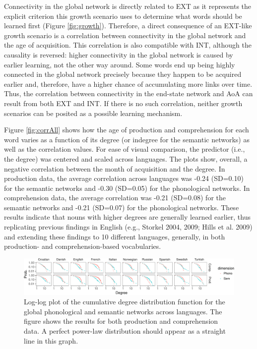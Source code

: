 \documentclass[english,floatsintext,man]{apa6}
\theoremstyle{definition}
\theoremstyle{definition}
\theoremstyle{definition}
\theoremstyle{remark}
\begin{document}
Connectivity in the global network is directly related to EXT as it
represents the explicit criterion this growth scenario uses to determine
what words should be learned first (Figure \ref{fig:growth}). Therefore,
a direct consequence of an EXT-like growth scenario is a correlation
between connectivity in the global network and the age of acquisition.
This correlation is also compatible with INT, although the causality is
reversed: higher connectivity in the global network is caused by earlier
learning, not the other way around. Some words end up being highly
connected in the global network precisely because they happen to be
acquired earlier and, therefore, have a higher chance of accumulating
more links over time. Thus, the correlation between connectivity in the
end-state network and AoA can result from both EXT and INT. If there is
no such correlation, neither growth scenarios can be posited as a
possible learning mechanism.

Figure \ref{fig:corrAll} shows how the age of production and
comprehension for each word varies as a function of its degree (or
indegree for the semantic networks) as well as the correlation values.
For ease of visual comparison, the predictor (i.e., the degree) was
centered and scaled across languages. The plots show, overall, a
negative correlation between the month of acquisition and the degree. In
production data, the average correlation across languages was -0.24
(SD=0.10) for the semantic networks and -0.30 (SD=0.05) for the
phonological networks. In comprehension data, the average correlation
was -0.21 (SD=0.08) for the semantic networks and -0.21 (SD=0.07) for
the phonological networks. These results indicate that nouns with higher
degrees are generally learned earlier, thus replicating previous
findings in English (e.g., Storkel 2004, 2009; Hills et al. 2009) and
extending these findings to 10 different languages, generally, in both
production- and comprehension-based vocabularies.

\begin{figure}[!h]
\includegraphics[width=\textwidth]{ms_files/figure-latex/degreeDist-1} \caption{Log-log plot of the cumulative degree distribution function for the global phonological and semantic networks across languages. The figure shows the results for both production and comprehension data. A perfect power-law distribution should appear as a straight line in this graph.}\label{fig:degreeDist}
\end{figure}
\end{document}
